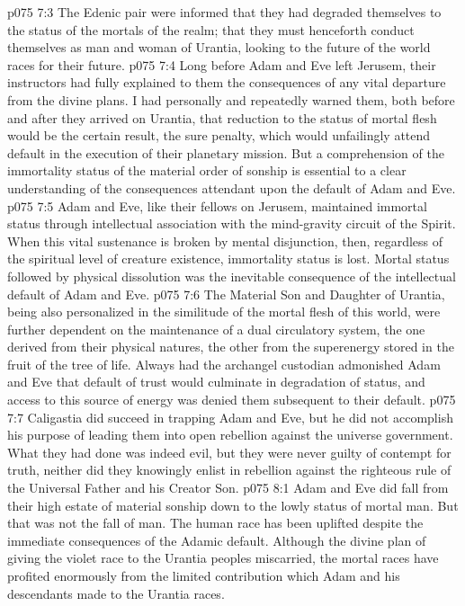 \vs p075 7:3 The Edenic pair were informed that they had degraded themselves to the status of the mortals of the realm; that they must henceforth conduct themselves as man and woman of Urantia, looking to the future of the world races for their future.
\vs p075 7:4 Long before Adam and Eve left Jerusem, their instructors had fully explained to them the consequences of any vital departure from the divine plans. I had personally and repeatedly warned them, both before and after they arrived on Urantia, that reduction to the status of mortal flesh would be the certain result, the sure penalty, which would unfailingly attend default in the execution of their planetary mission. But a comprehension of the immortality status of the material order of sonship is essential to a clear understanding of the consequences attendant upon the default of Adam and Eve.
\vs p075 7:5 \bibnobreakspace Adam and Eve, like their fellows on Jerusem, maintained immortal status through intellectual association with the mind\hyp{}gravity circuit of the Spirit. When this vital sustenance is broken by mental disjunction, then, regardless of the spiritual level of creature existence, immortality status is lost. Mortal status followed by physical dissolution was the inevitable consequence of the intellectual default of Adam and Eve.
\vs p075 7:6 \bibnobreakspace The Material Son and Daughter of Urantia, being also personalized in the similitude of the mortal flesh of this world, were further dependent on the maintenance of a dual circulatory system, the one derived from their physical natures, the other from the superenergy stored in the fruit of the tree of life. Always had the archangel custodian admonished Adam and Eve that default of trust would culminate in degradation of status, and access to this source of energy was denied them subsequent to their default.
\vs p075 7:7 \pc Caligastia did succeed in trapping Adam and Eve, but he did not accomplish his purpose of leading them into open rebellion against the universe government. What they had done was indeed evil, but they were never guilty of contempt for truth, neither did they knowingly enlist in rebellion against the righteous rule of the Universal Father and his Creator Son.
\vs p075 8:1 Adam and Eve did fall from their high estate of material sonship down to the lowly status of mortal man. But that was not the fall of man. The human race has been uplifted despite the immediate consequences of the Adamic default. Although the divine plan of giving the violet race to the Urantia peoples miscarried, the mortal races have profited enormously from the limited contribution which Adam and his descendants made to the Urantia races.
